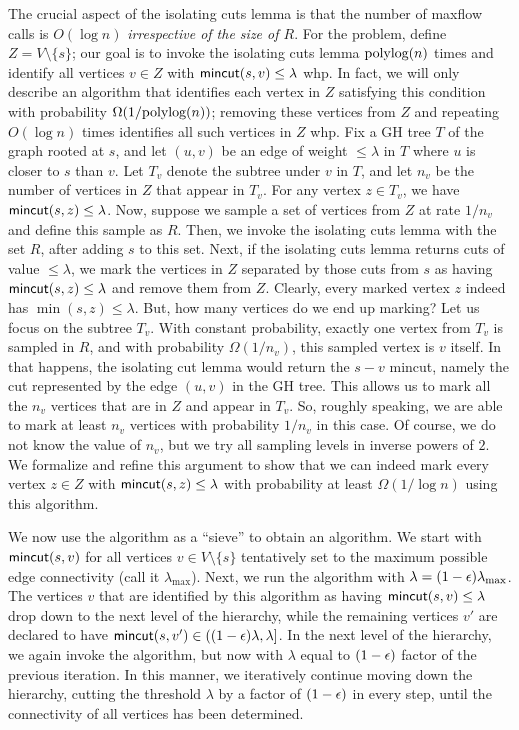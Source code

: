 The crucial aspect of the isolating cuts lemma is that the number of maxflow calls is $O(\log n)$ {\em irrespective of the size of $R$}. For the \ct problem, define $Z= V\setminus \{s\}$; our goal is to invoke the isolating cuts lemma $\textup{polylog}(n)$ times and identify all vertices $v\in Z$ with $\textsf{\textup{mincut}}(s, v)\le \lambda$ whp. In fact, we will only describe an algorithm that identifies each vertex in $Z$ satisfying this condition with probability $\Omega(1/\textup{polylog}(n))$; removing these vertices from $Z$ and repeating $O(\log n)$ times identifies all such vertices in $Z$ whp. Fix a GH tree $T$ of the graph rooted at $s$, and let $(u, v)$ be an edge of weight $\le \lambda$ in $T$ where $u$ is closer to $s$ than $v$. Let $T_v$ denote the subtree under $v$ in $T$, and let $n_v$ be the number of vertices in $Z$ that appear in $T_v$. For any vertex $z\in T_v$, we have $\textsf{\textup{mincut}}(s, z) \le \lambda$. Now, suppose we sample a set of vertices from $Z$ at rate $1/n_v$ and define this sample as $R$. Then, we invoke the isolating cuts lemma with the set $R$, after adding $s$ to this set. Next, if the isolating cuts lemma returns cuts of value $\le \lambda$, we mark the vertices in $Z$ separated by those cuts from $s$ as having $\textsf{\textup{mincut}}(s, z)\le \lambda$ and remove them from $Z$. Clearly, every marked vertex $z$ indeed has $\min(s, z)\le \lambda$. But, how many vertices do we end up marking? Let us focus on the subtree $T_v$. With constant probability, exactly one vertex from $T_v$ is sampled in $R$, and with probability $\Omega(1/n_v)$, this sampled vertex is $v$ itself. In that happens, the isolating cut lemma would return the $s-v$ mincut, namely the cut represented by the edge $(u, v)$ in the GH tree. This allows us to mark all the $n_v$ vertices that are in $Z$ and appear in $T_v$. So, roughly speaking, we are able to mark at least $n_v$ vertices with probability $1/n_v$ in this case. Of course, we do not know the value of $n_v$, but we try all sampling levels in inverse powers of $2$. We formalize and refine this argument to show that we can indeed mark every vertex $z\in Z$ with $\textsf{\textup{mincut}}(s, z) \le \lambda$ with probability at least $\Omega(1/\log n)$ using this algorithm.

We now use the \ct algorithm as a ``sieve'' to obtain an \ssc algorithm. We start with $\textsf{\textup{mincut}}(s, v)$ for all vertices $v\in V\setminus \{s\}$ tentatively set to the maximum possible edge connectivity (call it $\lambda_{\max}$). Next, we run the \ct algorithm with $\lambda = (1-\epsilon) \lambda_{\max}$. The vertices $v$ that are identified by this algorithm as having $\textsf{\textup{mincut}}(s, v) \le \lambda$ drop down to the next level of the hierarchy, while the remaining vertices $v'$ are declared to have $\textsf{\textup{mincut}}(s, v') \in ((1-\epsilon)\lambda, \lambda]$. In the next level of the hierarchy, we again invoke the \ct algorithm, but now with $\lambda$ equal to $(1-\epsilon)$ factor of the previous iteration. In this manner, we iteratively continue moving down the hierarchy, cutting the threshold $\lambda$ by a factor of $(1-\epsilon)$ in every step, until the connectivity of all vertices has been determined.

